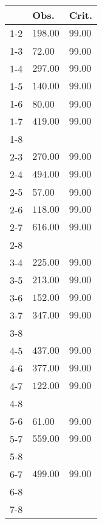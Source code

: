 \begin{table}[ht]
\centering
\begin{tabular}{rll}
  \hline
 & Obs. & Crit. \\ 
  \hline
1-2 & \(\mathbf{198.00}\) & \(\mathbf{99.00}\) \\ 
  1-3 & 72.00 & 99.00 \\ 
  1-4 & \(\mathbf{297.00}\) & \(\mathbf{99.00}\) \\ 
  1-5 & \(\mathbf{140.00}\) & \(\mathbf{99.00}\) \\ 
  1-6 & 80.00 & 99.00 \\ 
  1-7 & \(\mathbf{419.00}\) & \(\mathbf{99.00}\) \\ 
  1-8 &  &  \\ 
  2-3 & \(\mathbf{270.00}\) & \(\mathbf{99.00}\) \\ 
  2-4 & \(\mathbf{494.00}\) & \(\mathbf{99.00}\) \\ 
  2-5 & 57.00 & 99.00 \\ 
  2-6 & \(\mathbf{118.00}\) & \(\mathbf{99.00}\) \\ 
  2-7 & \(\mathbf{616.00}\) & \(\mathbf{99.00}\) \\ 
  2-8 &  &  \\ 
  3-4 & \(\mathbf{225.00}\) & \(\mathbf{99.00}\) \\ 
  3-5 & \(\mathbf{213.00}\) & \(\mathbf{99.00}\) \\ 
  3-6 & \(\mathbf{152.00}\) & \(\mathbf{99.00}\) \\ 
  3-7 & \(\mathbf{347.00}\) & \(\mathbf{99.00}\) \\ 
  3-8 &  &  \\ 
  4-5 & \(\mathbf{437.00}\) & \(\mathbf{99.00}\) \\ 
  4-6 & \(\mathbf{377.00}\) & \(\mathbf{99.00}\) \\ 
  4-7 & \(\mathbf{122.00}\) & \(\mathbf{99.00}\) \\ 
  4-8 &  &  \\ 
  5-6 & 61.00 & 99.00 \\ 
  5-7 & \(\mathbf{559.00}\) & \(\mathbf{99.00}\) \\ 
  5-8 &  &  \\ 
  6-7 & \(\mathbf{499.00}\) & \(\mathbf{99.00}\) \\ 
  6-8 &  &  \\ 
  7-8 &  &  \\ 
   \hline
\end{tabular}
\end{table}
